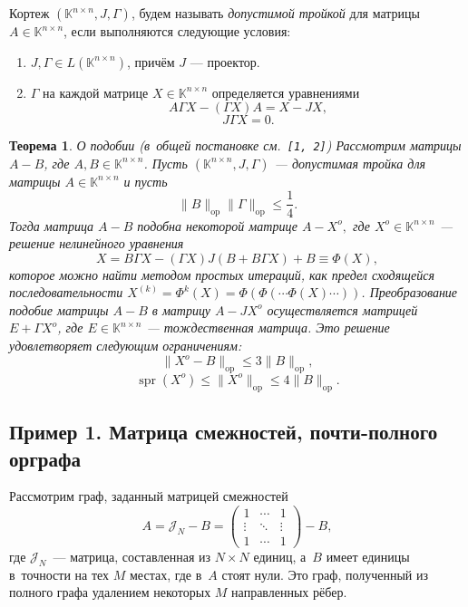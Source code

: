 \documentclass[12pt]{article}
\newtheorem*{ksvthm*}{Теорема}
\theoremstyle{definition}
\begin{document}
Кортеж \( (\mathbb{K}^{n{\times}n}, J, \Gamma) \),
    будем называть \emph{допустимой тройкой}
    для матрицы \( A\in\mathbb{K}^{n\times n} \),
    если выполняются следующие условия:
\begin{enumerate}
\item
    \( J,\Gamma\in L(\mathbb{K}^{n{\times}n}) \),
    причём \( J \) --- проектор.
\item
    \( \Gamma \) на каждой матрице \( X\in \mathbb{K}^{n\times n} \)
    определяется уравнениями
    \[ A\Gamma X - (\Gamma X) A = X - JX, \]
    \[ J\Gamma X = 0. \]
\end{enumerate}

\begin{ksvthm*}{О подобии (в~общей постановке см.~\texttt{[1, 2]})}
    Рассмотрим матрицы \( A-B \),
        где \( A,B\in \mathbb{K}^{n{\times}n} \).
    Пусть \( (\mathbb{K}^{n\times n}, J, \Gamma) \)
        --- допустимая тройка для матрицы \( A\in\mathbb{K}^{n{\times}n} \)
        и пусть
    \[
        \|B\|_{\mathrm{op}} \|\Gamma\|_{\mathrm{op}} \leq \frac14.
        \]
    Тогда матрица \( A-B \)
        подобна некоторой матрице \( A-X^o, \)
        где \( X^o\in\mathbb{K}^{n{\times}n} \)
        --- решение нелинейного уравнения
    \[
        X = B\Gamma X - (\Gamma X)J(B + B\Gamma X) + B \equiv \Phi(X),
        \]
        которое можно найти методом простых итераций,
        как предел сходящейся последовательности
        \( X^{(k)} = \Phi^{k}(X) = \Phi(\Phi(\cdots\Phi(X)\cdots)) \).
    Преобразование подобие матрицы \( A-B \)
        в матрицу \( A-JX^o \) осуществляется
        матрицей \( E+\Gamma X^o \),
        где \( E\in\mathbb{K}^{n{\times}n} \) --- тождественная матрица.
    Это решение удовлетворяет следующим ограничениям:
    \[ \|X^o - B\|_{\mathrm{op}} \leq 3\|B\|_{\mathrm{op}}, \]
    \[ \operatorname{spr}(X^o) \leq \|X^o\|_{\mathrm{op}} \leq 4\|B\|_{\mathrm{op}}. \]
\end{ksvthm*}
\subsection*{Пример 1. Матрица смежностей, почти-полного орграфа}
Рассмотрим граф, заданный матрицей смежностей
\[ A = \mathcal{J}_N - B =
   \begin{pmatrix}1 & \cdots & 1\\ \vdots & \ddots & \vdots \\ 1 & \cdots & 1\end{pmatrix} - B,
   \]
    где \( \mathcal{J}_N \)~--- матрица, составленная из \( N{\times}N \) единиц,
    а~\( B \) имеет единицы в~точности на тех \( M \) местах,
    где в~\( A \) стоят нули.
Это граф, полученный из полного графа
    удалением некоторых \( M \) направленных рёбер.
\end{document}
